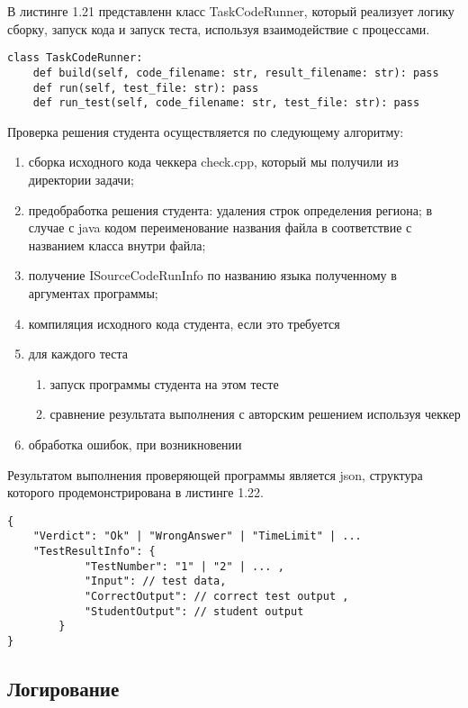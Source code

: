 В листинге 1.21 представленн класс TaskCodeRunner, который реализует логику сборку, запуск кода и запуск теста, используя взаимодействие с процессами. 

\begin{lstlisting}[caption={Сигнатура класса TaskCodeRunner}]
class TaskCodeRunner:
    def build(self, code_filename: str, result_filename: str): pass
    def run(self, test_file: str): pass
    def run_test(self, code_filename: str, test_file: str): pass
\end{lstlisting}

Проверка решения студента осуществляется по следующему алгоритму:
\begin{enumerate}
    \item сборка исходного кода чеккера check.cpp, который мы получили из директории задачи;
    \item предобработка решения студента: удаления строк определения региона; в случае с java кодом переименование названия файла в соответствие с названием класса внутри файла;
    \item получение ISourceCodeRunInfo по названию языка полученному в аргументах программы;
    \item компиляция исходного кода студента, если это требуется
    \item для каждого теста
    \begin{enumerate}
        \item запуск программы студента на этом тесте
        \item сравнение результата выполнения с авторским решением используя чеккер
    \end{enumerate}
    \item обработка ошибок, при возникновении
\end{enumerate}

Результатом выполнения проверяющей программы является json, структура которого продемонстрирована в листинге 1.22.

\begin{lstlisting}[caption={RunningResult}]
{
    "Verdict": "Ok" | "WrongAnswer" | "TimeLimit" | ...
    "TestResultInfo": {
            "TestNumber": "1" | "2" | ... ,
            "Input": // test data,
            "CorrectOutput": // correct test output ,
            "StudentOutput": // student output
        }
}
\end{lstlisting}

\subsection{Логирование}

